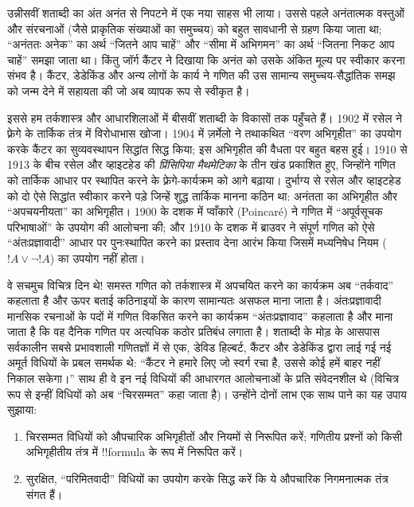 \documentclass[../../../include/open-logic-section]{subfiles}
\begin{document}
उन्नीसवीं शताब्दी का अंत अनंत से निपटने में एक नया साहस भी लाया। उससे पहले
अनंतात्मक वस्तुओं और संरचनाओं (जैसे प्राकृतिक संख्याओं का समुच्चय) को बहुत
सावधानी से ग्रहण किया जाता था; ``अनंततः अनेक'' का अर्थ ``जितने आप चाहें'' और
``सीमा में अभिगमन'' का अर्थ ``जितना निकट आप चाहें'' समझा जाता था। किंतु जॉर्ग
कैंटर ने दिखाया कि अनंत को उसके अंकित मूल्य पर स्वीकार करना संभव है। कैंटर,
डेडेकिंड और अन्य लोगों के कार्य ने गणित की उस सामान्य समुच्चय-सैद्धांतिक समझ
को जन्म देने में सहायता की जो अब व्यापक रूप से स्वीकृत है।

इससे हम तर्कशास्त्र और आधारशिलाओं में बीसवीं शताब्दी के विकासों तक पहुँचते
हैं। 1902 में रसेल ने फ़्रेगे के तार्किक तंत्र में विरोधाभास खोजा। 1904 में
ज़र्मेलो ने तथाकथित ``वरण अभिगृहीत'' का उपयोग करके कैंटर का सुव्यवस्थापन
सिद्धांत सिद्ध किया; इस अभिगृहीत की वैधता पर बहुत बहस हुई। 1910 से 1913 के
बीच रसेल और व्हाइटहेड की \emph{प्रिंसिपिया मैथमेटिका} के तीन खंड प्रकाशित
हुए, जिन्होंने गणित को तार्किक आधार पर स्थापित करने के फ़्रेगे-कार्यक्रम को
आगे बढ़ाया। दुर्भाग्य से रसेल और व्हाइटहेड को दो ऐसे सिद्धांत स्वीकार करने
पड़े जिन्हें शुद्ध तार्किक मानना कठिन था: अनंतता का अभिगृहीत और
``अपचयनीयता'' का अभिगृहीत। 1900 के दशक में प्वाँकारे (Poincar\'e) ने गणित में
``अपूर्वसूचक परिभाषाओं'' के उपयोग की आलोचना की; और 1910 के दशक में ब्राउवर ने
संपूर्ण गणित को ऐसे ``अंतःप्रज्ञावादी'' आधार पर पुनःस्थापित करने का प्रस्ताव
देना आरंभ किया जिसमें मध्यनिषेध नियम ($!A \lor \lnot !A$) का उपयोग नहीं होता।

वे सचमुच विचित्र दिन थे!{} समस्त गणित को तर्कशास्त्र में अपचयित करने का
कार्यक्रम अब ``तर्कवाद'' कहलाता है और ऊपर बताई कठिनाइयों के कारण सामान्यतः
असफल माना जाता है। अंतःप्रज्ञावादी मानसिक रचनाओं के पदों में गणित विकसित करने
का कार्यक्रम ``अंतःप्रज्ञावाद'' कहलाता है और माना जाता है कि वह दैनिक गणित पर
अत्यधिक कठोर प्रतिबंध लगाता है। शताब्दी के मोड़ के आसपास सर्वकालीन सबसे
प्रभावशाली गणितज्ञों में से एक, डेविड हिल्बर्ट, कैंटर और डेडेकिंड द्वारा लाई
गई नई अमूर्त विधियों के प्रबल समर्थक थे: ``कैंटर ने हमारे लिए जो स्वर्ग रचा
है, उससे कोई हमें बाहर नहीं निकाल सकेगा।'' साथ ही वे इन नई विधियों की आधारगत
आलोचनाओं के प्रति संवेदनशील थे (विचित्र रूप से इन्हीं विधियों को अब
``चिरसम्मत'' कहा जाता है)। उन्होंने दोनों लाभ एक साथ पाने का यह उपाय सुझाया:
\begin{enumerate}
\item चिरसम्मत विधियों को औपचारिक अभिगृहीतों और नियमों से निरूपित करें;
  गणितीय प्रश्नों को किसी अभिगृहीतीय तंत्र में !!{formula} के रूप में निरूपित
  करें।
\item सुरक्षित, ``परिमितवादी'' विधियों का उपयोग करके सिद्ध करें कि ये
  औपचारिक निगमनात्मक तंत्र संगत हैं।
\end{enumerate}
\end{document}
